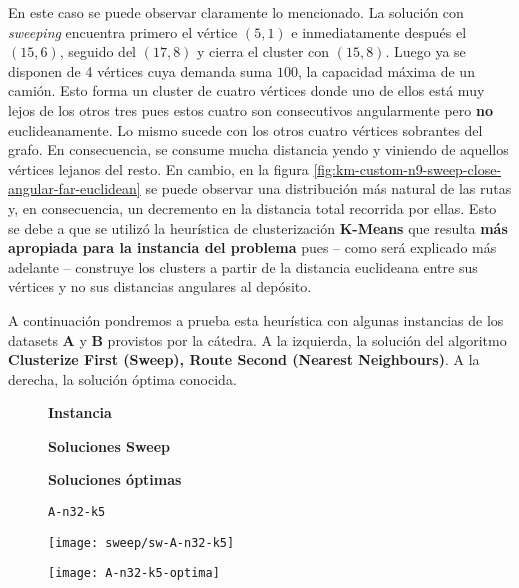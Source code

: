 En este caso se puede observar claramente lo mencionado. La solución con \textit{sweeping} encuentra primero el vértice $(5, 1)$ e inmediatamente después el $(15, 6)$, seguido del $(17, 8)$ y cierra el cluster con $(15, 8)$. Luego ya se disponen de 4 vértices cuya demanda suma $100$, la capacidad máxima de un camión. Esto forma un cluster de cuatro vértices donde uno de ellos está muy lejos de los otros tres pues estos cuatro son consecutivos angularmente pero \textbf{no} euclideanamente. Lo mismo sucede con los otros cuatro vértices sobrantes del grafo. En consecuencia, se consume mucha distancia yendo y viniendo de aquellos vértices lejanos del resto. En cambio, en la figura \ref{fig:km-custom-n9-sweep-close-angular-far-euclidean} se puede observar una distribución más natural de las rutas y, en consecuencia, un decremento en la distancia total recorrida por ellas. Esto se debe a que se utilizó la heurística de clusterización \textbf{K-Means} que resulta \textbf{más apropiada para la instancia del problema} pues – como será explicado más adelante – construye los clusters a partir de la distancia euclideana entre sus vértices y no sus distancias angulares al depósito.

A continuación pondremos a prueba esta heurística con algunas instancias de los datasets \textbf{A} y \textbf{B} provistos por la cátedra. A la izquierda, la solución del algoritmo \textbf{Clusterize First (Sweep), Route Second (Nearest Neighbours)}. A la derecha, la solución óptima conocida.

\begin{figure}[H]
	\begin{minipage}{0.15\textwidth}
		\centering
		\textbf{Instancia}
	\end{minipage}%
	\begin{minipage}{0.40\textwidth}
		\centering
		\textbf{Soluciones Sweep}
	\end{minipage}%
	\hspace{0.03\textwidth}
	\begin{minipage}{0.40\textwidth}
		\centering
		\textbf{Soluciones óptimas}
	\end{minipage}%

	\begin{minipage}{0.15\textwidth}
		\centering
		\texttt{A-n32-k5}
	\end{minipage}%
	\begin{minipage}{0.40\textwidth}
		\centering
		\texttt{[image: sweep/sw-A-n32-k5]}\par
	\end{minipage}%
	\hspace{0.03\textwidth}
	\begin{minipage}{0.40\textwidth}
		\centering
		\texttt{[image: A-n32-k5-optima]}\par
	\end{minipage}%
\end{figure}

